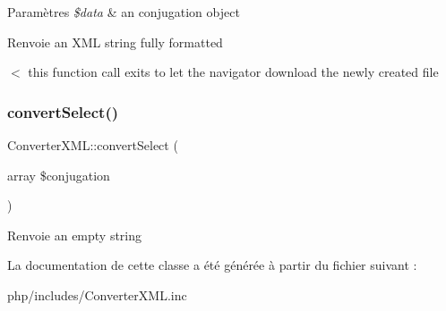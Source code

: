 \begin{DoxyParams}{Paramètres}
{\em \$data} & an conjugation object \\
\hline
\end{DoxyParams}
\begin{DoxyReturn}{Renvoie}
an X\+ML string fully formatted 
\end{DoxyReturn}
$<$ this function call exits to let the navigator download the newly created file \hypertarget{classConverterXML_a68b03941080baea355f4d9c71743343e}{}\label{classConverterXML_a68b03941080baea355f4d9c71743343e} 
\subsubsection{\texorpdfstring{convert\+Select()}{convertSelect()}}
{\footnotesize\ttfamily Converter\+X\+M\+L\+::convert\+Select (\begin{DoxyParamCaption}\item[{array}]{\$conjugation }\end{DoxyParamCaption})}

\begin{DoxyReturn}{Renvoie}
an empty string 
\end{DoxyReturn}


La documentation de cette classe a été générée à partir du fichier suivant \+:\begin{DoxyCompactItemize}
\item 
php/includes/Converter\+X\+M\+L.\+inc\end{DoxyCompactItemize}
